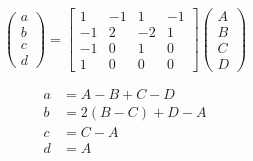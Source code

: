 \documentclass[a5paper,12pt]{article}
\begin{document}
\begin{equation}
\left( \begin{matrix} a \\ b\\ c \\d\end{matrix}\right)=\left[ \begin{matrix}
1 & -1 & 1 & -1 \\
-1 & 2 & -2 & 1 \\
-1 & 0 & 1 & 0 \\
1 & 0 & 0 & 0 
\end{matrix} \right]
\left( \begin{matrix} A \\ B\\ C \\D\end{matrix}\right) 
\end{equation}

\begin{align}\label{eq:solution}
a &= A-B+C-D \nonumber \\
b &= 2(B-C)+D-A \nonumber \\
c &= C-A \nonumber \\
d &= A
\end{align}

\clearpage
{}
\printindex
\end{document}
